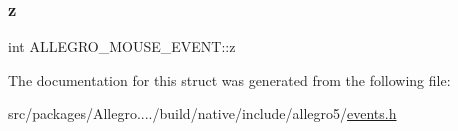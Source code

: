 \mbox{\label{struct_a_l_l_e_g_r_o___m_o_u_s_e___e_v_e_n_t_a32b3ba13557a8cd57153d608a84e8127}} 
\subsubsection{\texorpdfstring{z}{z}}
{\footnotesize\ttfamily int A\+L\+L\+E\+G\+R\+O\+\_\+\+M\+O\+U\+S\+E\+\_\+\+E\+V\+E\+N\+T\+::z}



The documentation for this struct was generated from the following file\+:\begin{DoxyCompactItemize}
\item 
src/packages/\+Allegro..../build/native/include/allegro5/\hyperlink{events_8h}{events.\+h}\end{DoxyCompactItemize}
